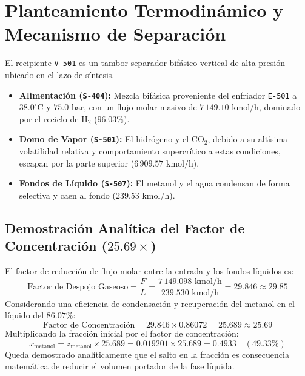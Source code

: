 \documentclass[11pt,letterpaper]{article}
\begin{document}
\section{Planteamiento Termodinámico y Mecanismo de Separación}

El recipiente \texttt{V-501} es un tambor separador bifásico vertical de alta presión ubicado en el lazo de síntesis.
\begin{itemize}
    \item \textbf{Alimentación (\texttt{S-404}):} Mezcla bifásica proveniente del enfriador \texttt{E-501} a $38.0^\circ\text{C}$ y $75.0\text{ bar}$, con un flujo molar masivo de $7\,149.10\text{ kmol/h}$, dominado por el reciclo de $\text{H}_2$ ($96.03\%$).
    \item \textbf{Domo de Vapor (\texttt{S-501}):} El hidrógeno y el $\text{CO}_2$, debido a su altísima volatilidad relativa y comportamiento supercrítico a estas condiciones, escapan por la parte superior ($6\,909.57\text{ kmol/h}$).
    \item \textbf{Fondos de Líquido (\texttt{S-507}):} El metanol y el agua condensan de forma selectiva y caen al fondo ($239.53\text{ kmol/h}$).
\end{itemize}

\subsection{\texorpdfstring{Demostración Analítica del Factor de Concentración ($25.69\times$)}{Demostración Analítica del Factor de Concentración (25.69x)}}
El factor de reducción de flujo molar entre la entrada y los fondos líquidos es:
\begin{equation}
    \text{Factor de Despojo Gaseoso} = \frac{F}{L} = \frac{7\,149.098\text{ kmol/h}}{239.530\text{ kmol/h}} = 29.846 \approx 29.85
\end{equation}
Considerando una eficiencia de condensación y recuperación del metanol en el líquido del $86.07\%$:
\begin{equation}
    \text{Factor de Concentración} = 29.846 \times 0.86072 = \mathbf{25.689} \approx \mathbf{25.69}
\end{equation}
Multiplicando la fracción inicial por el factor de concentración:
\begin{equation}
    x_{\text{metanol}} = z_{\text{metanol}} \times 25.689 = 0.019201 \times 25.689 = \mathbf{0.4933} \quad (49.33\%)
\end{equation}
Queda demostrado analíticamente que el salto en la fracción es consecuencia matemática de reducir el volumen portador de la fase líquida.
\end{document}
